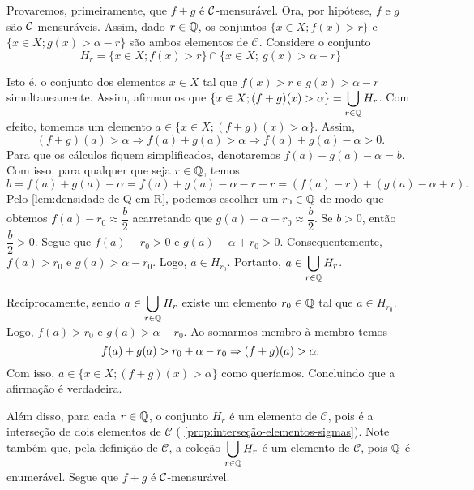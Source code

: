 \begin{prova}
    Provaremos, primeiramente, que $f+g$ é $\operatorname{\mathcal{C}}$-mensurável.
    Ora, por hipótese, $f$ e $g$ são $\operatorname{\mathcal{C}}$-mensuráveis. 
    Assim, dado $r \in \operatorname{\mathbb{Q}}$, os conjuntos $\{x \in X; f(x) > r\}$ e 
    $\{x \in X; g(x) > \alpha -r\}$ são ambos elementos de $\mathcal{C}$.
    Considere o conjunto  
    \vspace{-0.2cm}
    $$H_r = \{x \in X; f(x) > r\} \cap \{x \in X;\ g(x) > \alpha -r\}$$
    
    \vspace{-0.2cm}
    Isto é, o conjunto dos elementos $x \in X$ tal que $f(x) 
    > r$ e $g(x) >\alpha -r$ simultaneamente.
    Assim, afirmamos que $\{x \in X; (f+g)(x) > \alpha\} = \displaystyle \bigcup_{r \in \operatorname{\mathbb{Q}}} H_r$. Com efeito, tomemos um elemento 
    $a \in \{x \in X; (f+g)(x) > \alpha\}$.
    Assim, 
    $$
    (f+g)(a) > \alpha 
    \Rightarrow 
    f(a) + g(a) > \alpha 
    \Rightarrow f(a) + g(a) - \alpha > 0. 
    $$
    Para que os cálculos fiquem simplificados, denotaremos $f(a) + g(a) - \alpha = b$.
    Com isso, para qualquer que seja $r \in \operatorname{\mathbb{Q}}$, temos
    $$
    b 
    =
    f(a) + g(a) -\alpha 
    =
    f(a) + g(a) -\alpha - r + r
    =
    (f(a) -r) + (g(a) -\alpha + r).
    $$ 
    Pelo \ref{lem:densidade de Q em R}, podemos escolher um $r_0 \in \operatorname{\mathbb{Q}}$ de modo que obtemos $f(a) - r_0 \approx \dfrac{b}{2}$ acarretando que $g(a) -\alpha + r_0 \approx \dfrac{b}{2}$.
    Se $b > 0$, então $\dfrac{b}{2} > 0$.
    Segue que $f(a) - r_0 > 0 $ e $g(a) -\alpha + r_0 > 0$. 
    Consequentemente, $f(a) > r_0  $ e $g(a) > \alpha - r_0$.
    Logo, $a \in H_{r_0}$.
    Portanto, $ \displaystyle a \in \bigcup_{r \in \operatorname{\mathbb{Q}}} H_r$.
    
    Reciprocamente, sendo $ \displaystyle a \in \bigcup_{r \in \operatorname{\mathbb{Q}}} H_r$ existe um elemento $r_0 \in \operatorname{\mathbb{Q}}$ tal que $a \in H_{r_0}$.
    Logo, $f(a) > r_0$ e $g(a) > \alpha -r_0$.
    Ao somarmos membro à membro temos
    \vspace{-0.2cm}
    $$
    f(a) + g(a) > r_0 + \alpha -r_0
    \Rightarrow
    (f + g)(a) > \alpha. 
    \vspace{-0.2cm}
    $$
    Com isso, $a \in \{x \in X; (f +g)(x) > \alpha\}$ como queríamos.
    Concluindo que a afirmação é verdadeira. 
    
    Além disso, para cada $r \in \operatorname{\mathbb{Q}}$, o conjunto $H_r$ é um elemento de $\mathcal{C}$, pois é  a interseção de dois elementos de $\mathcal{C}$ ( \ref{prop:interseção-elementos-sigmas}).
    Note também que, pela definição de $\mathcal{C}$, a coleção $\displaystyle \bigcup_{r \in \operatorname{\mathbb{Q}}} H_r$ é um elemento de $\mathcal{C}$, pois $\operatorname{\mathbb{Q}}$ é enumerável.
    Segue que $f+g$ é $\operatorname{\mathcal{C}}$-mensurável.


\end{prova}
